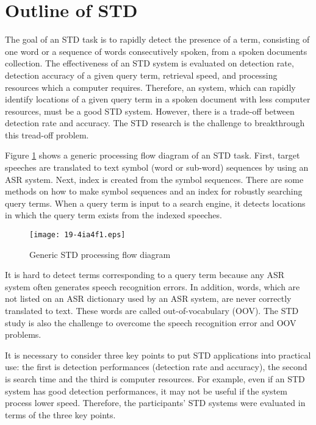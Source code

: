 \documentclass[english]{jnlp_1.4}
\begin{document}
\section{Outline of STD} \label{sec:outline}

The goal of an STD task is to rapidly detect the presence of a term,
consisting of one word or a sequence of words consecutively spoken, from
a spoken documents collection. 
The effectiveness of an STD system is evaluated on detection rate,
detection accuracy of a given query term, retrieval speed, and
processing resources which a computer requires. 
Therefore, an system, which can rapidly identify locations of a given
query term in a spoken document with less computer resources, must be a
good STD system. 
However, there is a trade-off between detection rate and accuracy.
The STD research is the challenge to breakthrough this tread-off problem.

Figure \ref{fig:STDoutline} shows a generic processing flow diagram of
an STD task. 
First, target speeches are translated to text symbol (word or sub-word)
sequences by using an ASR system. 
Next, index is created from the symbol sequences. 
There are some methods on how to make symbol sequences and an index for
robustly searching query terms.
When a query term is input to a search engine, it detects locations
in which the query term exists from the indexed speeches. 

\begin{figure}[t]
\begin{center}
\texttt{[image: 19-4ia4f1.eps]}
\end{center}
\caption{Generic STD processing flow diagram}
\label{fig:STDoutline}
\end{figure}

It is hard to detect terms corresponding to a query term 
because any ASR system often generates speech recognition errors. 
In addition, words, which are not listed on an ASR 
dictionary used by an ASR system, are never correctly translated to
text. These words are called out-of-vocabulary (OOV). 
The STD study is also the challenge to overcome the speech recognition 
error and OOV problems.

It is necessary to consider three key points to put STD applications
into practical use: the first is detection performances (detection rate
and accuracy), the second is search time and the third is computer
resources. 
For example, even if an STD system has good detection performances, it
may not be useful if the system process lower speed. 
Therefore, the participants' STD systems were evaluated in terms of the
three key points. 
\end{document}

